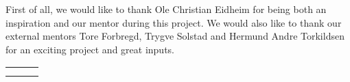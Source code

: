 \documentclass[a4paper, 11pt, oneside]{Thesis}  %
\begin{document}
{First of all, we would like to thank Ole Christian Eidheim for being both an inspiration and our mentor during this project. We would also like to thank our external mentors Tore Forbregd, Trygve Solstad and Hermund Andre Torkildsen for an exciting project and great inputs. %

\vfill

\begin{tabularx}{\textwidth}{XXX}
\centering{$\rule{4cm}{0.15mm}$} & \centering{$\rule{4cm}{0.15mm}$} & \centering{$\rule{4cm}{0.15mm}$} \tabularnewline
\centering{Even Dalen} & \centering{Håvard Langdal} & \centering{Torkil Solheim} \\
\end{tabularx}

\centering{\mydate}\\

}

\clearpage  %
\end{document}
